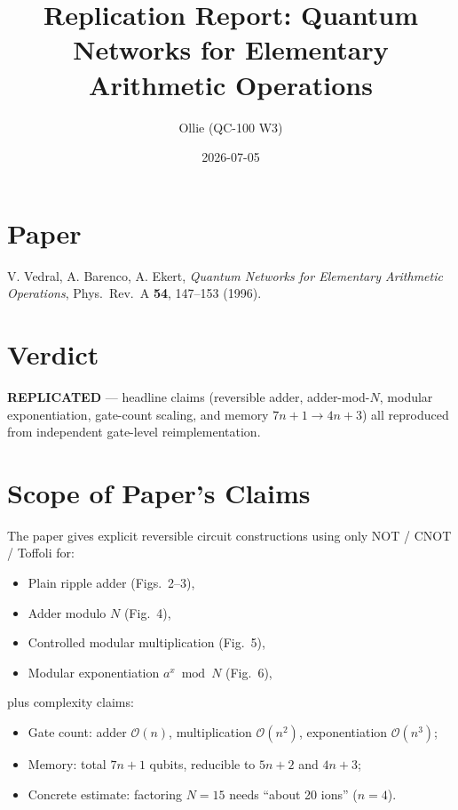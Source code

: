 \documentclass[11pt]{article}
\title{Replication Report: Quantum Networks for Elementary Arithmetic Operations}
\author{Ollie (QC-100 W3)}
\date{2026-07-05}
\begin{document}
\maketitle

\section*{Paper}
V. Vedral, A. Barenco, A. Ekert, \emph{Quantum Networks for Elementary Arithmetic Operations},
Phys.\ Rev.\ A \textbf{54}, 147--153 (1996).

\section*{Verdict}
\textbf{REPLICATED} --- headline claims (reversible adder, adder-mod-$N$,
modular exponentiation, gate-count scaling, and memory $7n{+}1 \to 4n{+}3$) all
reproduced from independent gate-level reimplementation.

\section{Scope of Paper's Claims}
The paper gives explicit reversible circuit constructions using only
NOT / CNOT / Toffoli for:
\begin{itemize}
  \item Plain ripple adder (Figs.~2--3),
  \item Adder modulo $N$ (Fig.~4),
  \item Controlled modular multiplication (Fig.~5),
  \item Modular exponentiation $a^x \bmod N$ (Fig.~6),
\end{itemize}
plus complexity claims:
\begin{itemize}
  \item Gate count: adder $\mathcal{O}(n)$, multiplication $\mathcal{O}(n^2)$,
        exponentiation $\mathcal{O}(n^3)$;
  \item Memory: total $7n{+}1$ qubits, reducible to $5n{+}2$ and $4n{+}3$;
  \item Concrete estimate: factoring $N{=}15$ needs ``about 20 ions'' ($n{=}4$).
\end{itemize}
\end{document}
